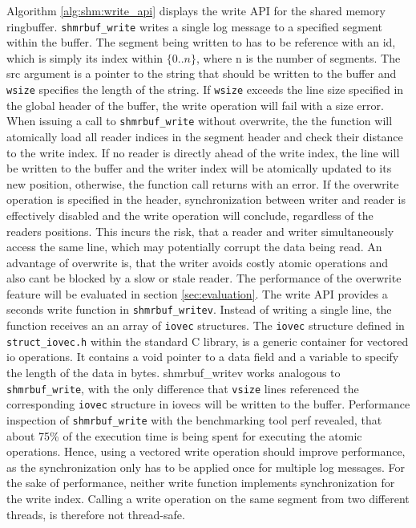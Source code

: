 Algorithm \ref{alg:shm:write_api} displays the write API for the shared memory ringbuffer. \texttt{shmrbuf\_write}
writes a single log message to a specified segment within the buffer. The segment being written to has to be reference with an id, which is simply its index within $\{0..n\}$, where
n is the number of segments. The src argument is a pointer to the string that should be written to the buffer and \texttt{wsize} specifies the length of the string.
If \texttt{wsize} exceeds the line size specified in the global header of the buffer, the write operation will fail with a size error. When issuing a call to \texttt{shmrbuf\_write} without overwrite, the 
the function will atomically load all reader indices in the segment header and check their distance to the write index. If no reader is directly ahead of the write index, the line will be written
to the buffer and the writer index will be atomically updated to its new position, otherwise, the function call returns with an error. If the overwrite operation is specified in the header, synchronization between writer and reader is
effectively disabled and the write operation will conclude, regardless of the readers positions. This incurs the risk, that a reader and writer simultaneously access 
the same line, which may potentially corrupt the data being read. An advantage of overwrite is, that the writer avoids costly atomic operations and also cant be blocked 
by a slow or stale reader. The performance of the overwrite feature will be evaluated in section \ref{sec:evaluation}.
The write API provides a seconds write function in \texttt{shmrbuf\_writev}. Instead of writing a single line, the function receives an  
an array of \texttt{iovec} structures. The \texttt{iovec} structure defined in \texttt{struct\_iovec.h} within the standard C library, is a generic container for vectored
io operations. It contains a void pointer to a data field and a variable to specify the length of the data in bytes. 
shmrbuf\_writev works analogous to \texttt{shmrbuf\_write}, with the only difference that \texttt{vsize} lines referenced the corresponding \texttt{iovec}
structure in iovecs will be written to the buffer. Performance inspection of \texttt{shmrbuf\_write} with the benchmarking tool
perf \cite{perf} revealed, that about 75\% of the execution time is being spent for executing the atomic operations. Hence, 
using a vectored write operation should improve performance, as the synchronization only has to be applied once for multiple log messages.
For the sake of performance, neither write function implements synchronization for the write index. Calling a write operation
on the same segment from two different threads, is therefore not thread-safe.

